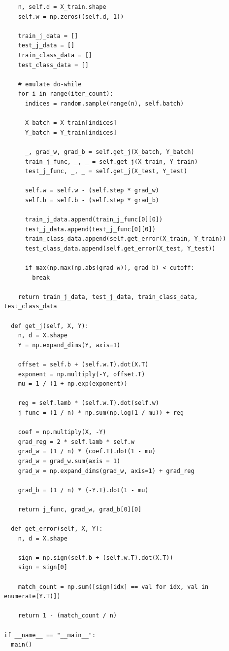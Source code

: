 \documentclass{article}
\newcommand{\1}{\mathbf{1}}
\begin{document}
{\begin{verbatim}
    n, self.d = X_train.shape
    self.w = np.zeros((self.d, 1))

    train_j_data = []
    test_j_data = []
    train_class_data = []
    test_class_data = []

    # emulate do-while
    for i in range(iter_count):
      indices = random.sample(range(n), self.batch)
      
      X_batch = X_train[indices]
      Y_batch = Y_train[indices]

      _, grad_w, grad_b = self.get_j(X_batch, Y_batch)
      train_j_func, _, _ = self.get_j(X_train, Y_train)
      test_j_func, _, _ = self.get_j(X_test, Y_test)

      self.w = self.w - (self.step * grad_w)
      self.b = self.b - (self.step * grad_b)

      train_j_data.append(train_j_func[0][0])
      test_j_data.append(test_j_func[0][0])
      train_class_data.append(self.get_error(X_train, Y_train))
      test_class_data.append(self.get_error(X_test, Y_test))

      if max(np.max(np.abs(grad_w)), grad_b) < cutoff:
        break

    return train_j_data, test_j_data, train_class_data, test_class_data

  def get_j(self, X, Y):
    n, d = X.shape
    Y = np.expand_dims(Y, axis=1)

    offset = self.b + (self.w.T).dot(X.T)
    exponent = np.multiply(-Y, offset.T)
    mu = 1 / (1 + np.exp(exponent))

    reg = self.lamb * (self.w.T).dot(self.w)
    j_func = (1 / n) * np.sum(np.log(1 / mu)) + reg

    coef = np.multiply(X, -Y)
    grad_reg = 2 * self.lamb * self.w
    grad_w = (1 / n) * (coef.T).dot(1 - mu)
    grad_w = grad_w.sum(axis = 1)
    grad_w = np.expand_dims(grad_w, axis=1) + grad_reg

    grad_b = (1 / n) * (-Y.T).dot(1 - mu)

    return j_func, grad_w, grad_b[0][0]

  def get_error(self, X, Y):
    n, d = X.shape

    sign = np.sign(self.b + (self.w.T).dot(X.T))
    sign = sign[0]

    match_count = np.sum([sign[idx] == val for idx, val in enumerate(Y.T)])

    return 1 - (match_count / n)

if __name__ == "__main__":
  main()


\end{verbatim}}
\end{document}
